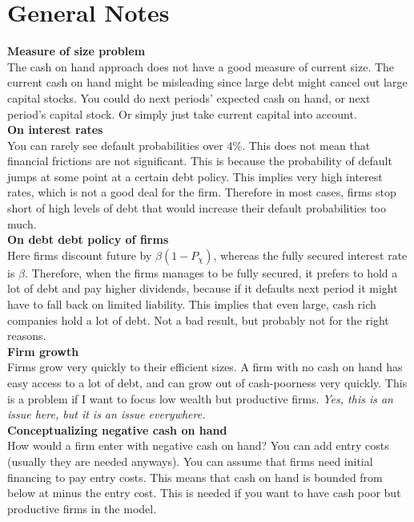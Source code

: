 \documentclass[12pt]{article}
\begin{document}
\section*{General Notes}
\textbf{Measure of size problem} \\
The cash on hand approach does not have a good measure of current size. The current cash on hand might be misleading since large debt might cancel out large capital stocks. You could do next periods' expected cash on hand, or next period's capital stock. Or simply just take current capital into account. \vspace{3mm} \\
\textbf{On interest rates} \\
You can rarely see default probabilities over 4\%. This does not mean that financial frictions are not significant. This is because the probability of default jumps at some point at a certain debt policy. This implies very high interest rates, which is not a good deal for the firm. Therefore in most cases, firms stop short of high levels of debt that would increase their default probabilities too much. \vspace{3mm} \\
\textbf{On debt debt policy of firms} \\
Here firms discount future by $\beta(1-P_\chi)$, whereas the fully secured interest rate is $\beta$. Therefore, when the firms manages to be fully secured, it prefers to hold a lot of debt and pay higher dividends, because if it defaults next period it might have to fall back on limited liability. This implies that even large, cash rich companies hold a lot of debt. Not a bad result, but probably not for the right reasons. \vspace{3mm} \\
\textbf{Firm growth} \\
Firms grow very quickly to their efficient sizes. A firm with no cash on hand has easy access to a lot of debt, and can grow out of cash-poorness very quickly. This is a problem if I want to focus low wealth but productive firms. \textit{Yes, this is an issue here, but it is an issue everywhere.} \vspace{3mm} \\
\textbf{Conceptualizing negative cash on hand} \\ 
How would a firm enter with negative cash on hand? You can add entry costs (usually they are needed anyways). You can assume that firms need initial financing to pay entry costs. This means that cash on hand is bounded from below at minus the entry cost. This is needed if you want to have cash poor but productive firms in the model. \vspace{3mm} \\
\end{document}
